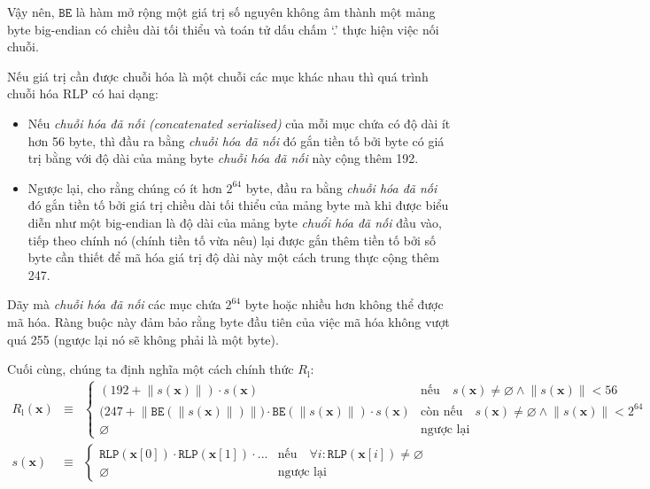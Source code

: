 \documentclass[9pt,oneside]{amsart}
\makeatletter
\newcommand{\linkdest}[1]{\Hy@raisedlink{\hypertarget{#1}{}}}
\makeatother
\begin{document}
Vậy nên, $\mathtt{BE}$ là hàm mở rộng một giá trị số nguyên không âm thành một mảng byte big-endian có chiều dài tối thiểu và toán tử dấu chấm `.' thực hiện việc nối chuỗi.

\hypertarget{RLP_serialisation_of_a_sequence_of_other_items_R__l_word_def}{}\linkdest{R__l}Nếu giá trị cần được chuỗi hóa là một chuỗi các mục khác nhau thì quá trình chuỗi hóa RLP có hai dạng:

\begin{itemize}
\item Nếu \textit{chuỗi hóa đã nối (concatenated serialised)} của mỗi mục chứa có độ dài ít hơn 56 byte, thì đầu ra bằng \textit{chuỗi hóa đã nối} đó gắn tiền tố bởi byte có giá trị bằng với độ dài của mảng byte \textit{chuỗi hóa đã nối} này cộng thêm 192.
\item Ngược lại, cho rằng chúng có ít hơn $2^{64}$ byte, đầu ra bằng \textit{chuỗi hóa đã nối} đó gắn tiền tố bởi giá trị chiều dài tối thiểu của mảng byte mà khi được biểu diễn như một big-endian là độ dài của mảng byte \textit{chuổi hóa đã nối} đầu vào, tiếp theo chính nó (chính tiền tố vừa nêu) lại được gắn thêm tiền tố bởi số byte cần thiết để mã hóa giá trị độ dài này một cách trung thực cộng thêm 247.
\end{itemize}

Dãy mà \textit{chuỗi hóa đã nối} các mục chứa $2^{64}$ byte hoặc nhiều hơn không thể được mã hóa. Ràng buộc này đảm bảo rằng byte đầu tiên của việc mã hóa không vượt quá 255 (ngược lại nó sẽ không phải là một byte).

\hypertarget{RLP_serialisation_of_a_sequence_of_other_items_R__l_math_def}{}Cuối cùng, chúng ta định nghĩa một cách chính thức $R_{\mathrm{l}}$:
\begin{eqnarray}
R_{\mathrm{l}}(\mathbf{x}) & \equiv & \begin{cases}
(192 + \lVert s(\mathbf{x}) \rVert) \cdot s(\mathbf{x}) & \text{nếu} \quad s(\mathbf{x}) \neq \varnothing \wedge \lVert s(\mathbf{x}) \rVert < 56 \\
\big(247 + \big\lVert \mathtt{BE}(\lVert s(\mathbf{x}) \rVert) \big\rVert \big) \cdot \mathtt{BE}(\lVert s(\mathbf{x}) \rVert) \cdot s(\mathbf{x}) & \text{còn nếu} \quad s(\mathbf{x}) \neq \varnothing \wedge \lVert s(\mathbf{x}) \rVert < 2^{64} \\
\varnothing & \text{ngược lại}
\end{cases} \\
s(\mathbf{x}) & \equiv & \begin{cases}
\mathtt{RLP}(\mathbf{x}[0]) \cdot \mathtt{RLP}(\mathbf{x}[1]) \cdot ... & \text{nếu} \quad \forall i: \mathtt{RLP}(\mathbf{x}[i]) \neq \varnothing \\
\varnothing & \text{ngược lại}
\end{cases}
\end{eqnarray}
\end{document}
